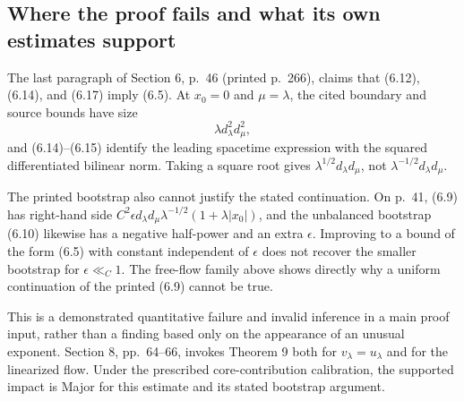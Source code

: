 \documentclass[10pt]{article}
\begin{document}
\subsection*{Where the proof fails and what its own estimates support}
The last paragraph of Section 6, p. 46 (printed p. 266), claims that (6.12), (6.14), and (6.17) imply (6.5). At \(x_0=0\) and \(\mu=\lambda\), the cited boundary and source bounds have size \[\lambda d_\lambda^2d_\mu^2,\] and (6.14)–(6.15) identify the leading spacetime expression with the squared differentiated bilinear norm. Taking a square root gives \(\lambda^{1/2}d_\lambda d_\mu\), not \(\lambda^{-1/2}d_\lambda d_\mu\).\par
The printed bootstrap also cannot justify the stated continuation. On p. 41, (6.9) has right-hand side \(C^2\epsilon d_\lambda d_\mu\lambda^{-1/2}(1+\lambda|x_0|)\), and the unbalanced bootstrap (6.10) likewise has a negative half-power and an extra \(\epsilon\). Improving to a bound of the form (6.5) with constant independent of \(\epsilon\) does not recover the smaller bootstrap for \(\epsilon\ll_C1\). The free-flow family above shows directly why a uniform continuation of the printed (6.9) cannot be true.\par
This is a demonstrated quantitative failure and invalid inference in a main proof input, rather than a finding based only on the appearance of an unusual exponent. Section 8, pp. 64–66, invokes Theorem 9 both for \(v_\lambda=u_\lambda\) and for the linearized flow. Under the prescribed core-contribution calibration, the supported impact is Major for this estimate and its stated bootstrap argument.\par
\end{document}
